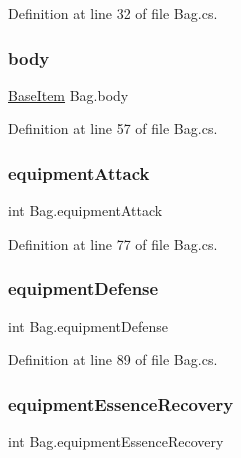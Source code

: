 Definition at line 32 of file Bag.\+cs.

\mbox{\label{class_bag_a1c9c49018ee2e88c1fd09df3bd6d9d9f}} 
\subsubsection{\texorpdfstring{body}{body}}
{\footnotesize\ttfamily \mbox{\hyperlink{class_base_item}{Base\+Item}} Bag.\+body\hspace{0.3cm}{\ttfamily [get]}}



Definition at line 57 of file Bag.\+cs.

\mbox{\label{class_bag_a009c51f2adf7e0dbddd0bcc97fee8708}} 
\subsubsection{\texorpdfstring{equipmentAttack}{equipmentAttack}}
{\footnotesize\ttfamily int Bag.\+equipment\+Attack\hspace{0.3cm}{\ttfamily [get]}}



Definition at line 77 of file Bag.\+cs.

\mbox{\label{class_bag_ade9d98eb07c941f15f1bf40eaa67523f}} 
\subsubsection{\texorpdfstring{equipmentDefense}{equipmentDefense}}
{\footnotesize\ttfamily int Bag.\+equipment\+Defense\hspace{0.3cm}{\ttfamily [get]}}



Definition at line 89 of file Bag.\+cs.

\mbox{\label{class_bag_a79e24ed265181b438682a9fbc6cc37a6}} 
\subsubsection{\texorpdfstring{equipmentEssenceRecovery}{equipmentEssenceRecovery}}
{\footnotesize\ttfamily int Bag.\+equipment\+Essence\+Recovery\hspace{0.3cm}{\ttfamily [get]}}



